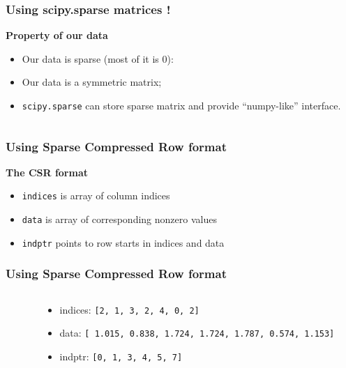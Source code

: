 \documentclass[xcolor=dvipsnames]{beamer}
\begin{document}
\begin{frame}
\frametitle{Using scipy.sparse matrices !}
{\bf \color{Blue} Property of our data}
\begin{itemize}[label={$\bullet$}]
\item Our data is sparse (most of it is 0):
\item Our data is a symmetric matrix;
\item \texttt{scipy.sparse} can store sparse matrix and provide ``numpy-like'' interface.
\end{itemize}

\begin{columns}
\begin{column}{0.5\linewidth}
\end{column}
\begin{column}{0.5\linewidth}

\end{column}
\end{columns}
\end{frame}

\begin{frame}
\frametitle{Using Sparse Compressed Row format}
{\bf \color{Blue} The CSR format}

\begin{itemize}[label={$\bullet$}]
\item \texttt{indices} is array of column indices
\item \texttt{data} is array of corresponding nonzero values
\item \texttt{indptr} points to row starts in indices and data
\end{itemize}
\end{frame}

\begin{frame}
\frametitle{Using Sparse Compressed Row format}
\begin{columns}
\begin{column}{0.5\linewidth}

\end{column}
\begin{column}{0.5\linewidth}
\begin{itemize}[label={$\bullet$}]
\item indices: {\small \texttt{[2, 1, 3, 2, 4, 0, 2]}}
\item data: {\small \texttt{[ 1.015,  0.838,  1.724,  1.724, 1.787,  0.574,
1.153]}}
\item indptr: {\small \texttt{[0, 1, 3, 4, 5, 7]}}
\end{itemize}
\end{column}

\end{columns}
\end{frame}
\end{document}
